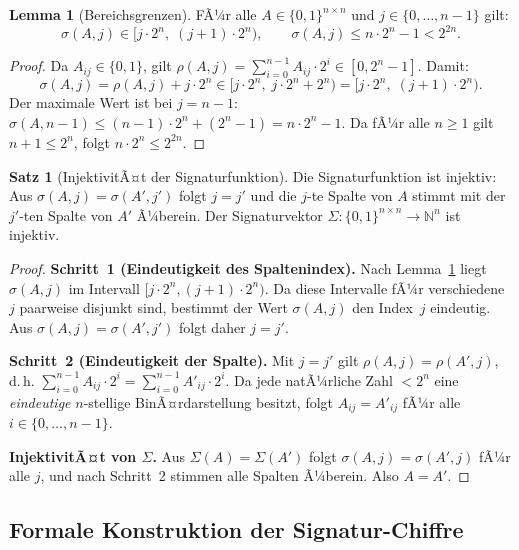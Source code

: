 ﻿\documentclass[a4paper,12pt]{article}
\theoremstyle{definition}
\newtheorem{satz}{Satz}[section]
\newtheorem{lemma}{Lemma}[section]
\begin{document}
\begin{lemma}[Bereichsgrenzen]
\label{lem:pqc-bounds}
FÃ¼r alle $A \in \{0,1\}^{n \times n}$ und $j \in \{0,\ldots,n-1\}$ gilt:
\[
  \sigma(A,j) \in \bigl[j \cdot 2^n,\; (j+1)\cdot 2^n\bigr),
  \qquad \sigma(A,j) \leq n \cdot 2^n - 1 < 2^{2n}.
\]
\end{lemma}

\begin{proof}
Da $A_{ij} \in \{0,1\}$, gilt $\rho(A,j) = \sum_{i=0}^{n-1}A_{ij}\cdot 2^i
\in [0, 2^n-1]$. Damit:
\[
  \sigma(A,j) = \rho(A,j) + j \cdot 2^n \in [j \cdot 2^n,\; j \cdot 2^n + 2^n)
  = [j \cdot 2^n,\; (j+1) \cdot 2^n).
\]
Der maximale Wert ist bei $j = n-1$:
$\sigma(A,n-1) \leq (n-1)\cdot 2^n + (2^n - 1) = n\cdot 2^n - 1$.
Da fÃ¼r alle $n \geq 1$ gilt $n + 1 \leq 2^n$, folgt $n \cdot 2^n \leq 2^{2n}$.
\end{proof}

\begin{satz}[InjektivitÃ¤t der Signaturfunktion]
\label{satz:pqc-inj}
Die Signaturfunktion ist injektiv: Aus $\sigma(A,j) = \sigma(A',j')$
folgt $j = j'$ und die $j$-te Spalte von $A$ stimmt mit der $j'$-ten Spalte
von $A'$ Ã¼berein.
Der Signaturvektor $\Sigma: \{0,1\}^{n \times n} \to \mathbb{N}^n$ ist injektiv.
\end{satz}

\begin{proof}
\textbf{Schritt~1 (Eindeutigkeit des Spaltenindex).}
Nach Lemma~\ref{lem:pqc-bounds} liegt $\sigma(A,j)$ im Intervall
$[j \cdot 2^n, (j+1) \cdot 2^n)$.
Da diese Intervalle fÃ¼r verschiedene $j$ paarweise disjunkt sind,
bestimmt der Wert $\sigma(A,j)$ den Index~$j$ eindeutig.
Aus $\sigma(A,j) = \sigma(A',j')$ folgt daher $j = j'$.

\textbf{Schritt~2 (Eindeutigkeit der Spalte).}
Mit $j = j'$ gilt $\rho(A,j) = \rho(A',j)$, d.\,h.
$\sum_{i=0}^{n-1} A_{ij} \cdot 2^i = \sum_{i=0}^{n-1} A'_{ij} \cdot 2^i$.
Da jede natÃ¼rliche Zahl $< 2^n$ eine \emph{eindeutige} $n$-stellige BinÃ¤rdarstellung
besitzt, folgt $A_{ij} = A'_{ij}$ fÃ¼r alle $i \in \{0,\ldots,n-1\}$.

\textbf{InjektivitÃ¤t von $\Sigma$.}
Aus $\Sigma(A) = \Sigma(A')$ folgt $\sigma(A,j) = \sigma(A',j)$ fÃ¼r alle
$j$, und nach Schritt~2 stimmen alle Spalten Ã¼berein. Also $A = A'$.
\end{proof}

\subsection{Formale Konstruktion der Signatur-Chiffre}
\end{document}
